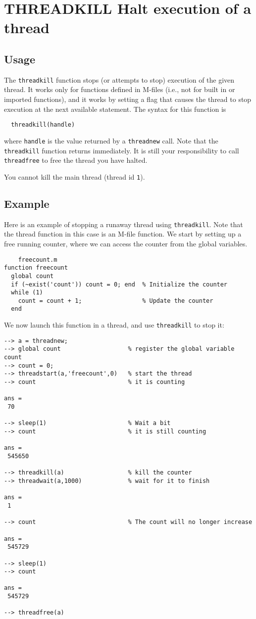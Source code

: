 \section{THREADKILL Halt execution of a thread}

\subsection{Usage}

The \verb|threadkill| function stops (or attempts to stop) execution
of the given thread.  It works only for functions defined in M-files
(i.e., not for built in or imported functions), and it works by 
setting a flag that causes the thread to stop execution at the next
available statement.  The syntax for this function is 
\begin{verbatim}
  threadkill(handle)
\end{verbatim}
where \verb|handle| is the value returned by a \verb|threadnew| call.  
Note that the \verb|threadkill| function returns immediately.  It 
is still your responsibility to call \verb|threadfree| to free
the thread you have halted.

You cannot kill the main thread (thread id \verb|1|).
\subsection{Example}

Here is an example of stopping a runaway thread using \verb|threadkill|.
Note that the thread function in this case is an M-file function.
We start by setting up a free running counter, where we can access 
the counter from the global variables.  
\begin{verbatim}
    freecount.m
function freecount
  global count
  if (~exist('count')) count = 0; end  % Initialize the counter
  while (1)
    count = count + 1;                 % Update the counter
  end
\end{verbatim}
We now launch this function in a thread, and use \verb|threadkill| to
stop it:
\begin{verbatim}
--> a = threadnew;
--> global count                   % register the global variable count
--> count = 0;
--> threadstart(a,'freecount',0)   % start the thread
--> count                          % it is counting

ans = 
 70 

--> sleep(1)                       % Wait a bit
--> count                          % it is still counting

ans = 
 545650 

--> threadkill(a)                  % kill the counter
--> threadwait(a,1000)             % wait for it to finish

ans = 
 1 

--> count                          % The count will no longer increase

ans = 
 545729 

--> sleep(1)
--> count

ans = 
 545729 

--> threadfree(a)
\end{verbatim}
